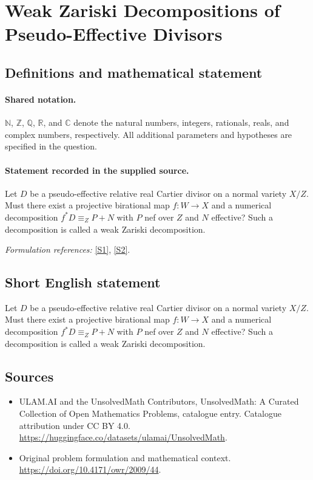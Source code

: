 \documentclass[11pt]{article}
\newcommand{\sref}[2]{\hyperlink{source:#1:#2}{[S#2]}}
\begin{document}
\section{Weak Zariski Decompositions of Pseudo-Effective Divisors}\label{statement}

\subsection{Definitions and mathematical statement}

\paragraph{Shared notation.}$\mathbb N$, $\mathbb Z$, $\mathbb Q$, $\mathbb R$, and $\mathbb C$ denote the natural numbers, integers, rationals, reals, and complex numbers, respectively. All additional parameters and hypotheses are specified in the question.


\paragraph{Statement recorded in the supplied source.}
Let $D$ be a pseudo-effective relative real Cartier divisor on a normal variety $X/Z$. Must there exist a projective birational map $f:W\to X$ and a numerical decomposition $f^*D\equiv_Z P+N$ with $P$ nef over $Z$ and $N$ effective? Such a decomposition is called a weak Zariski decomposition.
\par\smallskip\textit{Formulation references:} \sref{statement}{1}, \sref{statement}{2}.
\subsection{Short English statement}
Let $D$ be a pseudo-effective relative real Cartier divisor on a normal variety $X/Z$. Must there exist a projective birational map $f:W\to X$ and a numerical decomposition $f^*D\equiv_Z P+N$ with $P$ nef over $Z$ and $N$ effective? Such a decomposition is called a weak Zariski decomposition.
\subsection{Sources}
\begin{itemize}
\item[\hypertarget{source:statement:1}{S1}] ULAM.AI and the UnsolvedMath Contributors, UnsolvedMath: A Curated Collection of Open Mathematics Problems, catalogue entry. Catalogue attribution under CC BY 4.0.
\url{https://huggingface.co/datasets/ulamai/UnsolvedMath}.
\item[\hypertarget{source:statement:2}{S2}] Original problem formulation and mathematical context.
\url{https://doi.org/10.4171/owr/2009/44}.
\end{itemize}
\label{end:statement}
\end{document}
